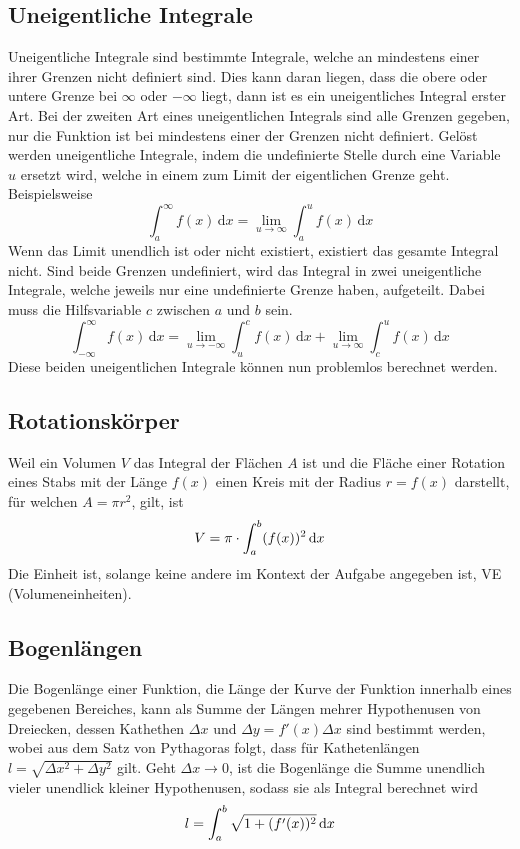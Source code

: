 \documentclass{article}
\begin{document}
\subsection{Uneigentliche Integrale}
Uneigentliche Integrale sind bestimmte Integrale, welche an mindestens einer ihrer Grenzen nicht definiert sind. Dies kann daran liegen, dass die obere oder untere Grenze bei $\infty$ oder $-\infty$ liegt, dann ist es ein uneigentliches Integral erster Art. Bei der zweiten Art eines uneigentlichen Integrals sind alle Grenzen gegeben, nur die Funktion ist bei mindestens einer der Grenzen nicht definiert. \newline
Gelöst werden uneigentliche Integrale, indem die undefinierte Stelle durch eine Variable $u$ ersetzt wird, welche in einem zum Limit der eigentlichen Grenze geht. Beispielsweise
\[
 \int_a^\infty f(x)\,\mathrm{d}x =
 \lim_{u \to \infty} \int_a^u f(x)\,\mathrm{d}x
\]
Wenn das Limit unendlich ist oder nicht existiert, existiert das gesamte Integral nicht. \newline 
Sind beide Grenzen undefiniert, wird das Integral in zwei uneigentliche Integrale, welche jeweils nur eine undefinierte Grenze haben, aufgeteilt. Dabei muss die Hilfsvariable $c$ zwischen $a$ und $b$ sein.
\[
 \int_{-\infty}^\infty f(x)\,\mathrm{d}x =
 \lim_{u \to -\infty} \int_u^c f(x)\,\mathrm{d}x + 
 \lim_{u \to \infty} \int_c^u f(x)\,\mathrm{d}x
\]
Diese beiden uneigentlichen Integrale können nun problemlos berechnet werden.  
 
\subsection{Rotationskörper}
Weil ein Volumen $V$ das Integral der Flächen $A$ ist und die Fläche einer Rotation eines Stabs mit der Länge $f(x)$ einen Kreis mit der Radius $r=f(x)$ darstellt, für welchen $A=\pi r^2$, gilt, ist
\[V = \pi \cdot \int_a^b (f(x))^2 \,\mathrm{d}{x}\]
Die Einheit ist, solange keine andere im Kontext der Aufgabe angegeben ist, VE (Volumeneinheiten). 
  
\subsection{Bogenlängen}
Die Bogenlänge einer Funktion, die Länge der Kurve der Funktion innerhalb eines gegebenen Bereiches, kann als Summe der Längen mehrer Hypothenusen von Dreiecken, dessen Kathethen $\Delta x$ und $\Delta y = f'(x) \Delta x$ sind bestimmt werden, wobei aus dem Satz von Pythagoras folgt, dass für Kathetenlängen $l = \sqrt{\Delta x^2 + \Delta y^2}$ gilt.
Geht $\Delta x \to 0$, ist die Bogenlänge die Summe unendlich vieler unendlick kleiner Hypothenusen, sodass sie als Integral berechnet wird
\[l = \int_a^b \sqrt{1+(f'(x))^2} \,\mathrm{d}{x}\]   
 
\end{document}
